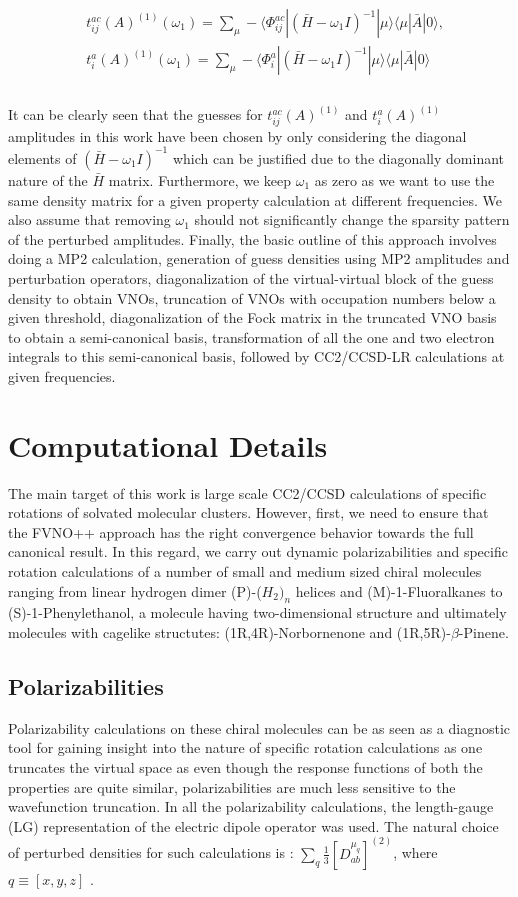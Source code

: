 \begin{equation}
\begin{split}
& t^{ac}_{ij}(A)^{(1)}(\omega_1) = \sum_\mu - \langle\Phi_{ij}^{ac}| {(\bar{H} -\omega_1 I)}^{-1} |
\mu\rangle\langle \mu| \bar{A} | 0\rangle, \\
& t^{a}_{i}(A)^{(1)}(\omega_1) = \sum_\mu -\langle\Phi_{i}^{a}| {(\bar{H} -\omega_1 I)}^{-1} |
\mu\rangle \langle \mu| \bar{A} | 0\rangle \\
\end{split}
\end{equation}
\\
It can be clearly seen that the guesses for $t^{ac}_{ij}(A)^{(1)}$ and 
$t^{a}_{i}(A)^{(1)}$ amplitudes in this work have been chosen by 
only considering the diagonal elements of $(\bar{H} -\omega_1 I)^{-1}$
which can be justified due to the diagonally dominant nature of the
$\bar{H}$ matrix. Furthermore, we keep $\omega_1$ as zero as we 
want to use the same density matrix for a given property calculation at different
frequencies. We also assume that removing $\omega_1$ should not significantly change the 
sparsity pattern of the perturbed amplitudes. Finally, the basic outline of this approach
involves doing a MP2 calculation, generation of guess densities using MP2 amplitudes and 
perturbation operators, diagonalization of the virtual-virtual block of the guess density 
to obtain VNOs, truncation of VNOs with occupation numbers below a given threshold, 
diagonalization of the Fock matrix in the truncated VNO basis to obtain a semi-canonical 
basis, transformation of all the one and two electron integrals to this semi-canonical 
basis, followed by CC2/CCSD-LR calculations at given frequencies.
\section{Computational Details}
The main target of this work is large scale CC2/CCSD calculations of specific 
rotations of solvated molecular clusters. However, first, we need to ensure 
that the FVNO++ approach has the right convergence behavior towards the full
canonical result. In this regard, we carry out dynamic polarizabilities 
and specific rotation calculations of a number of small and medium sized 
chiral molecules ranging from linear hydrogen dimer (P)-($H_2)_n$ helices
and (M)-1-Fluoralkanes to (S)-1-Phenylethanol, a molecule having two-dimensional 
structure and ultimately molecules with cagelike structutes: (1R,4R)-Norbornenone
and (1R,5R)-$\beta$-Pinene. 
\subsection{Polarizabilities}
Polarizability calculations on these chiral molecules can be as seen as a diagnostic 
tool for gaining insight into the nature of specific rotation calculations as one 
truncates the virtual space as even though the response functions of 
both the properties are quite similar, polarizabilities are much less sensitive to the 
wavefunction truncation. In all the polarizability calculations, the length-gauge 
(LG) representation of the electric dipole operator was used. The natural choice of 
perturbed densities for such calculations is : $\sum\limits_q \frac{1}{3}[{D^{\mu_q}_{ab}}]^{(2)}$,
where $q \equiv [x,y,z]$ . 

